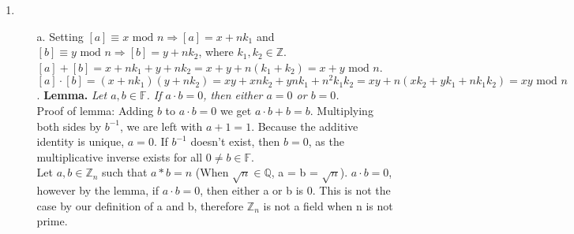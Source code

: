 \documentclass[10pt,english]{article}
\begin{document}
\begin{enumerate}
\begin{enumerate}
\end{enumerate}
\pagebreak
\item \begin{enumerate}
    \item [a.] Setting $[a]\equiv x \text{ mod }n \Rightarrow[a]=x+nk_1$ and $[b]\equiv y\text{ mod }n \Rightarrow [b]=y+nk_2$, where $k_1,k_2\in\mathbb{Z}$. $[a]+[b]=x+nk_1+y+nk_2=x+y+n(k_1+k_2)=x+y\text{ mod }n$. $[a]\cdot[b]=(x+nk_1)(y+nk_2)=xy + xnk_2+ynk_1+n^2k_1k_2=xy+n(xk_2+yk_1+nk_1k_2)=xy \text{ mod }n$. 
    \textbf{Lemma. }\textit{Let $a,b\in\mathbb{F}$. If $a\cdot b =0$, then either $a=0$ or $b=0$.}\\ 
Proof of lemma:     Adding $b$ to $a\cdot b = 0$ we get $a\cdot b + b = b$. Multiplying both sides by $b^{-1}$, we are left with $a + 1 = 1$. Because the additive identity is unique, $a = 0$. If $b^{-1}$ doesn't exist, then $b = 0$, as the multiplicative inverse exists for all $0 \neq b \in \mathbb{F}$.  \\ 
Let $a, b \in \mathbb{Z}_n$ such that $a * b = n$ (When $\sqrt{n} \in \mathbb{Q}$, a = b = $\sqrt{n}$). $a \cdot b = 0$, however by the lemma, if $a \cdot b = 0$, then either a or b is 0. This is not the case by our definition of a and b, therefore $\mathbb{Z}_n$ is not a field when n is not prime.



\end{enumerate}
\end{enumerate}
\end{document}
